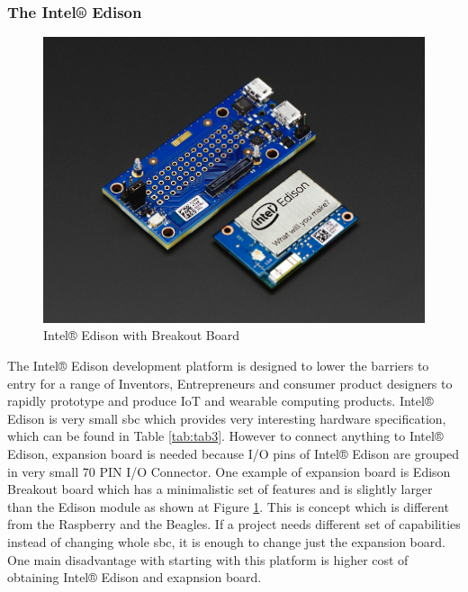 \subsubsection{The Intel® Edison} %
\label{ssub:the_intel_edison}
\begin{figure}[H]
\begin{center}
\captionsetup{font=small}
\includegraphics[scale=0.4]{pics/edison.png}
\caption{Intel® Edison with Breakout Board}
\label{fig:ch5}
\end{center}
\end{figure}
The Intel® Edison development platform is designed to lower the barriers to entry for a range of Inventors, Entrepreneurs and consumer product designers to rapidly prototype and produce IoT and wearable computing products.\cite{intel_what}\newline
Intel® Edison is very small \gls{sbc} which provides very interesting hardware specification, which can be found in Table \ref{tab:tab3}. However to connect anything to Intel® Edison, expansion board is needed because I/O pins of Intel® Edison are grouped in very small 70 PIN I/O Connector. One example of expansion board is Edison Breakout board which has a minimalistic set of features and is slightly larger than the Edison module as shown at Figure \ref{fig:ch5}. \newline This is concept which is different from the Raspberry and the Beagles. If a project needs different set of capabilities instead of changing whole \gls{sbc}, it is enough to change just the expansion board. One main disadvantage with starting with this platform is higher cost of obtaining Intel® Edison and exapnsion board.
